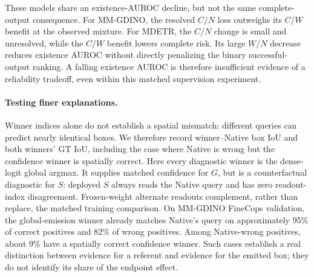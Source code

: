 \documentclass[10pt,twocolumn,letterpaper]{article}
\begin{document}


These models share an existence-AUROC decline, but not the same
complete-output consequence. For MM-GDINO, the resolved $C/N$ loss
outweighs its $C/W$ benefit at the observed mixture. For MDETR, the
$C/N$ change is small and unresolved, while the $C/W$ benefit lowers
complete risk. Its large $W/N$ decrease reduces existence AUROC without
directly penalizing the binary successful-output ranking. A falling
existence AUROC is therefore insufficient evidence of a reliability
tradeoff, even within this matched supervision experiment.

\paragraph{Testing finer explanations.}
Winner indices alone do not establish a spatial mismatch: different
queries can predict nearly identical boxes. We therefore record
winner--Native box IoU and both winners' GT IoU, including the case
where Native is wrong but the confidence winner is spatially correct.
Here every diagnostic winner is the dense-logit global argmax.
It supplies matched confidence for $G$, but is a counterfactual
diagnostic for $S$: deployed $S$ always reads the Native query and
has zero readout-index disagreement.
Frozen-weight alternate readouts complement, rather than replace,
the matched training comparison.
On MM-GDINO FineCops validation, the global-emission winner already
matches Native's query on approximately 95\% of correct positives and
82\% of wrong positives. Among Native-wrong positives, about 9\% have
a spatially correct confidence winner. Such cases establish a real
distinction between evidence for a referent and evidence for the emitted
box; they do not identify its share of the endpoint effect.
\end{document}
